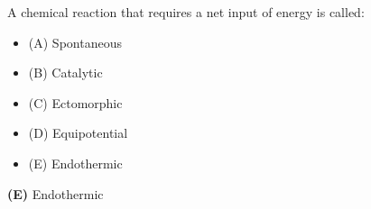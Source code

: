 

A chemical reaction that requires a net input of energy is called:

\begin{itemize}
\item{(A)} Spontaneous
\vskip 5pt 
\item{(B)} Catalytic
\vskip 5pt 
\item{(C)} Ectomorphic
\vskip 5pt 
\item{(D)} Equipotential
\vskip 5pt 
\item{(E)} Endothermic
\end{itemize}







{\bf (E)} Endothermic
 











